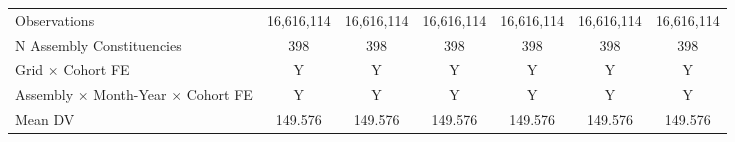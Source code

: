 \begin{tabular}{lcccccc}
Observations&  16,616,114         &  16,616,114         &  16,616,114         &  16,616,114         &  16,616,114         &  16,616,114         \\
N Assembly Constituencies&         398         &         398         &         398         &         398         &         398         &         398         \\
Grid $\times$ Cohort FE&           Y         &           Y         &           Y         &           Y         &           Y         &           Y         \\
Assembly $\times$ Month-Year $\times$ Cohort FE&           Y         &           Y         &           Y         &           Y         &           Y         &           Y         \\
Mean DV     &     149.576         &     149.576         &     149.576         &     149.576         &     149.576         &     149.576         \\
\hline
\end{tabular}

